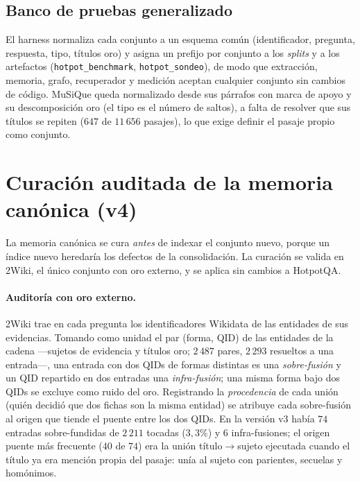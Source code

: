 \documentclass[11pt,a4paper]{article}
\begin{document}
\subsection{Banco de pruebas generalizado}
\label{sec:harness}

El harness normaliza cada conjunto a un esquema común (identificador,
pregunta, respuesta, tipo, títulos oro) y asigna un prefijo por conjunto a
los \emph{splits} y a los artefactos (\texttt{hotpot\_benchmark},
\texttt{hotpot\_sondeo}), de modo que extracción, memoria, grafo, recuperador
y medición aceptan cualquier conjunto sin cambios de código. MuSiQue queda
normalizado desde sus párrafos con marca de apoyo y su descomposición oro
(el tipo es el número de saltos), a falta de resolver que sus títulos se
repiten ($647$ de $11\,656$ pasajes), lo que exige definir el pasaje propio
como conjunto.

\section{Curación auditada de la memoria canónica (v4)}
\label{sec:memoria}

La memoria canónica se cura \emph{antes} de indexar el conjunto nuevo,
porque un índice nuevo heredaría los defectos de la consolidación. La
curación se valida en 2Wiki, el único conjunto con oro externo, y se aplica
sin cambios a HotpotQA.

\paragraph{Auditoría con oro externo.}
2Wiki trae en cada pregunta los identificadores Wikidata de las entidades de
sus evidencias. Tomando como unidad el par (forma, QID) de las entidades de
la cadena ---sujetos de evidencia y títulos oro; $2\,487$ pares, $2\,293$
resueltos a una entrada---, una entrada con dos QIDs de formas distintas es
una \emph{sobre-fusión} y un QID repartido en dos entradas una
\emph{infra-fusión}; una misma forma bajo dos QIDs se excluye como ruido del
oro. Registrando la \emph{procedencia} de cada unión (quién decidió que dos
fichas son la misma entidad) se atribuye cada sobre-fusión al origen que
tiende el puente entre los dos QIDs. En la versión v3 había $74$ entradas
sobre-fundidas de $2\,211$ tocadas ($3{,}3\%$) y $6$ infra-fusiones; el
origen puente más frecuente ($40$ de $74$) era la unión título$\to$sujeto
ejecutada cuando el título ya era mención propia del pasaje: unía al sujeto
con parientes, secuelas y homónimos.
\end{document}
